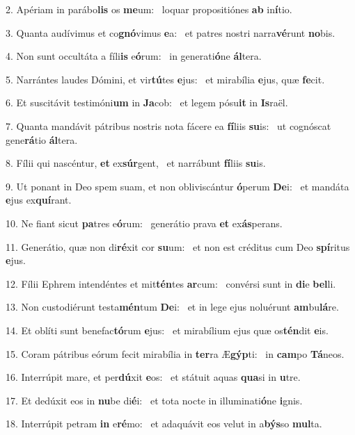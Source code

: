2. Apériam in parábo\textbf{lis} os \textbf{me}um: \ast\  loquar propositiónes \textbf{ab} in\textbf{í}tio.\

3. Quanta audívimus et co\textbf{gnó}vimus \textbf{e}a: \ast\  et patres nostri narra\textbf{vé}runt \textbf{no}bis.\

4. Non sunt occultáta a fíli\textbf{is} e\textbf{ó}rum: \ast\  in generati\textbf{ó}ne \textbf{ál}tera.\

5. Narrántes laudes Dómini, et vir\textbf{tú}tes \textbf{e}jus: \ast\  et mirabília \textbf{e}jus, quæ \textbf{fe}cit.\

6. Et suscitávit testimóni\textbf{um} in \textbf{Ja}cob: \ast\  et legem pósu\textbf{it} in \textbf{Is}raël.\

7. Quanta mandávit pátribus nostris nota fácere ea \textbf{fí}liis \textbf{su}is: \ast\  ut cognóscat gene\textbf{rá}tio \textbf{ál}tera.\

8. Fílii qui nascéntur, \textbf{et} ex\textbf{súr}gent, \ast\  et narrábunt \textbf{fí}liis \textbf{su}is.\

9. Ut ponant in Deo spem suam, et non obliviscántur \textbf{ó}perum \textbf{De}i: \ast\  et mandáta \textbf{e}jus ex\textbf{quí}rant.\

10. Ne fiant sicut \textbf{pa}tres e\textbf{ó}rum: \ast\  generátio prava \textbf{et} ex\textbf{ás}perans.\

11. Generátio, quæ non di\textbf{ré}xit cor \textbf{su}um: \ast\  et non est créditus cum Deo \textbf{spí}ritus \textbf{e}jus.\

12. Fílii Ephrem intendéntes et mit\textbf{tén}tes \textbf{ar}cum: \ast\  convérsi sunt in \textbf{di}e \textbf{bel}li.\

13. Non custodiérunt testa\textbf{mén}tum \textbf{De}i: \ast\  et in lege ejus noluérunt \textbf{am}bu\textbf{lá}re.\

14. Et oblíti sunt benefac\textbf{tó}rum \textbf{e}jus: \ast\  et mirabílium ejus quæ os\textbf{tén}dit \textbf{e}is.\

15. Coram pátribus eórum fecit mirabília in \textbf{ter}ra Æ\textbf{gýp}ti: \ast\  in \textbf{cam}po \textbf{Tá}neos.\

16. Interrúpit mare, et per\textbf{dú}xit \textbf{e}os: \ast\  et státuit aquas \textbf{qua}si in \textbf{u}tre.\

17. Et dedúxit eos in \textbf{nu}be di\textbf{é}i: \ast\  et tota nocte in illuminati\textbf{ó}ne \textbf{i}gnis.\

18. Interrúpit petram \textbf{in} e\textbf{ré}mo: \ast\  et adaquávit eos velut in a\textbf{býs}so \textbf{mul}ta.\

